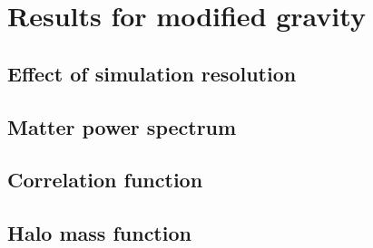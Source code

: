 \section{Results for modified gravity}

\subsection{Effect of simulation resolution}

\subsection{Matter power spectrum}

\subsection{Correlation function}

\subsection{Halo mass function}